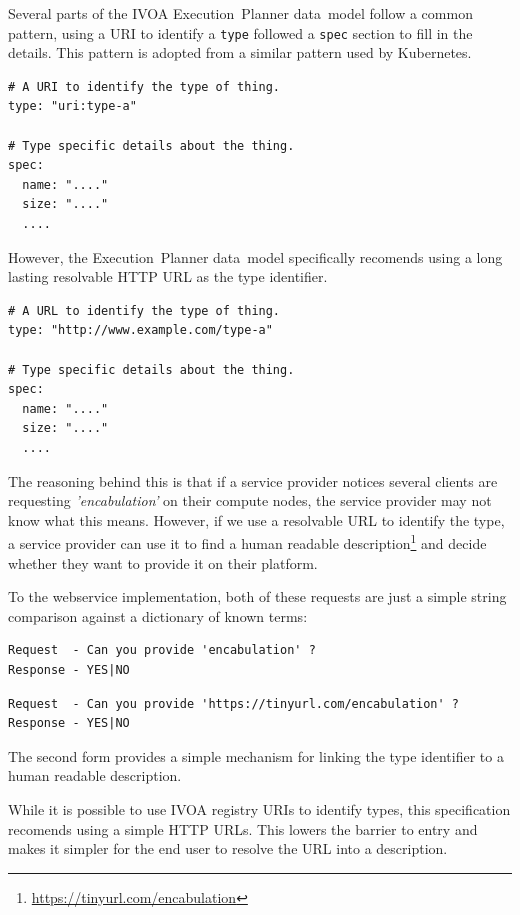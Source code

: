 \documentclass[11pt,a4paper]{ivoa}
\newcommand{\datamodel} {data~model}
\newcommand{\webservice} {webservice}
\newcommand{\ivoa} {IVOA}
\newcommand{\executionplanner} {Execution~Planner}
\newcommand{\kubernetes} {Kubernetes}
\newcommand{\codeword}[1] {\texttt{#1}}
\newcommand{\footurl}[1] {\footnote{\url{#1}}}
\begin{document}
Several parts of the \ivoa{} \executionplanner{} \datamodel{} follow a common pattern, using a URI
to identify a \codeword{type} followed a \codeword{spec} section to fill in the details.
This pattern is adopted from a similar pattern used by \kubernetes{}.

\begin{lstlisting}[]
# A URI to identify the type of thing.
type: "uri:type-a"

# Type specific details about the thing.
spec:
  name: "...."
  size: "...."
  ....
\end{lstlisting}

However, the \executionplanner{} \datamodel{} specifically recomends using a long lasting resolvable
HTTP URL as the type identifier.

\begin{lstlisting}[]
# A URL to identify the type of thing.
type: "http://www.example.com/type-a"

# Type specific details about the thing.
spec:
  name: "...."
  size: "...."
  ....
\end{lstlisting}

The reasoning behind this is that if a service provider notices several clients are requesting
\textit{'encabulation'} on their compute nodes, the service provider may not know what this means.
However, if we use a resolvable URL to identify the type, a service provider can use it to find a
human readable description\footurl{https://tinyurl.com/encabulation} and decide whether they want
to provide it on their platform.

To the \webservice{} implementation, both of these requests are just a simple string comparison against a
dictionary of known terms:

\begin{lstlisting}[]
Request  - Can you provide 'encabulation' ?
Response - YES|NO
\end{lstlisting}

\begin{lstlisting}[]
Request  - Can you provide 'https://tinyurl.com/encabulation' ?
Response - YES|NO
\end{lstlisting}

The second form provides a simple mechanism for linking the type identifier to a human readable description.

While it is possible to use \ivoa{} registry URIs to identify types, this specification
recomends using a simple HTTP URLs. This lowers the barrier to entry and makes it simpler for the end user
to resolve the URL into a description.
\end{document}
